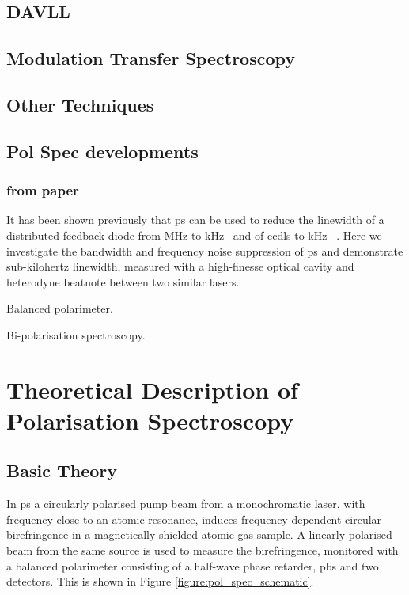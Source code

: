 \subsection{DAVLL}

\subsection{Modulation Transfer Spectroscopy}

\subsection{Other Techniques}

\subsection{Pol Spec developments}

\subsubsection{from paper}
It has been shown previously that \gls*{ps} can be used to reduce the linewidth of a distributed feedback diode from \unit[2]{MHz} to \unit[20]{kHz}~\cite{torii_laser-phase_2012} and of \glspl*{ecdl} to \unit[65]{kHz}
~\cite{yoshikawa_frequency_2003}.
Here we investigate the bandwidth and frequency noise suppression of \gls*{ps} and demonstrate sub-kilohertz linewidth, measured with a high-finesse optical cavity and heterodyne beatnote between two similar lasers.

Balanced polarimeter.\cite{pearman_polarization_2002,yutaka_frequency_2003}

Bi-polarisation spectroscopy.\cite{tiwari_laser_2006}


\section{Theoretical Description of Polarisation Spectroscopy}\label{section:pol_spec_theory}
\subsection{Basic Theory}

In \gls{ps} a circularly polarised pump beam from a monochromatic laser, with frequency close to an atomic resonance, induces frequency-dependent circular birefringence in a magnetically-shielded atomic gas sample.
A linearly polarised beam from the same source is used to measure the birefringence, monitored with a balanced polarimeter consisting of a half-wave phase retarder, \gls{pbs} and two detectors.
This is shown in Figure \ref{figure:pol_spec_schematic}.

